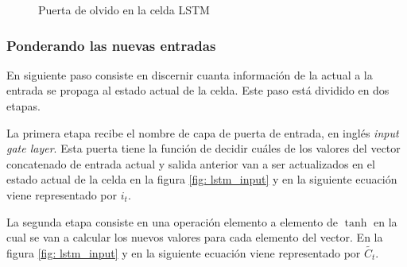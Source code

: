 \begin{figure}[ht!]
{
	}      
	\caption{Puerta de olvido en la celda \gls{LSTM}}
	\label{fig: lstm_forgot}
\end{figure}

\subsubsection{Ponderando las nuevas entradas}
En siguiente paso consiste en discernir cuanta información de la actual a la entrada se propaga al estado actual de la celda. Este paso está dividido en dos etapas.

La primera etapa recibe el nombre de capa de puerta de entrada, en inglés \textit{input gate layer}. Esta puerta tiene la función de decidir cuáles de los valores del vector concatenado de entrada actual y salida anterior van a ser actualizados en el estado actual de la celda en la figura \ref{fig: lstm_input} y en la siguiente ecuación viene representado por $i_t$.

La segunda etapa consiste en una operación elemento a elemento de $\tanh$ en la cual se van a calcular los nuevos valores para cada elemento del vector. En la figura \ref{fig: lstm_input} y en la siguiente ecuación viene representado por $\widetilde{C_t}$.

